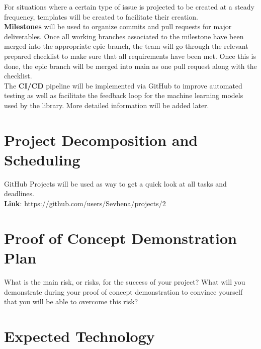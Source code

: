 \documentclass{article}
\begin{document}
\noindent
For situations where a certain type of issue is projected to be created at a steady frequency, templates will be created to facilitate their creation. \\

\noindent
\textbf{Milestones} will be used to organize commits and pull requests for major deliverables. Once all working branches associated to the milestone have been merged into the appropriate epic branch, the team will go through the relevant prepared checklist to make sure that all requirements have been met. Once this is done, the epic branch will be merged into main as one pull request along with the checklist. \\

\noindent
The \textbf{CI/CD} pipeline will be implemented via GitHub to improve automated testing as well as facilitate the feedback loop for the machine learning models used by the library. More detailed information will be added later. \\

\section{Project Decomposition and Scheduling}

GitHub Projects will be used as way to get a quick look at all tasks and deadlines. \\

\noindent
\textbf{Link}: https://github.com/users/Sevhena/projects/2 \\


\section{Proof of Concept Demonstration Plan}

What is the main risk, or risks, for the success of your project?  What will you
demonstrate during your proof of concept demonstration to convince yourself that
you will be able to overcome this risk?

\section{Expected Technology}

\end{document}
